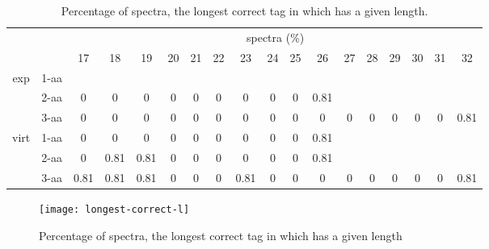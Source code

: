 \documentclass{article}[12pt]
\begin{document}
\begin{landscape}
\begin{table}[h]\tiny
\vspace{3mm}
{\centering
\begin{center}
\begin{tabular}{|c|l|c|c|c|c|c|c|c|c|c|c|c|c|c|c|c|c|}
  \hline
  \multicolumn{2}{|c|}{ } & \multicolumn{ 16 }{|c|}{ spectra (\%)} \\
  \cline{3- 18}
  \multicolumn{2}{|c|}{ }  & 17 & 18 & 19 & 20 & 21 & 22 & 23 & 24 & 25 & 26 & 27 & 28 & 29 & 30 & 31 & 32\\
  \hline
  \multirow{3}{*}{exp}
&  1-aa  &  &  &  &  &  &  &  &  &  &  &  &  &  &  &  & \\
&  2-aa  & 0 & 0 & 0 & 0 & 0 & 0 & 0 & 0 & 0 & 0.81 &  &  &  &  &  & \\
&  3-aa  & 0 & 0 & 0 & 0 & 0 & 0 & 0 & 0 & 0 & 0 & 0 & 0 & 0 & 0 & 0 & 0.81\\
 \hline
  \multirow{3}{*}{virt} 
&  1-aa  & 0 & 0 & 0 & 0 & 0 & 0 & 0 & 0 & 0 & 0.81 &  &  &  &  &  & \\
&  2-aa  & 0 & 0.81 & 0.81 & 0 & 0 & 0 & 0 & 0 & 0 & 0.81 &  &  &  &  &  & \\
&  3-aa  & 0.81 & 0.81 & 0.81 & 0 & 0 & 0 & 0.81 & 0 & 0 & 0 & 0 & 0 & 0 & 0 & 0 & 0.81\\
 \hline
\end{tabular}
\end{center}
\par}
\centering
\caption{ Percentage of spectra, the longest correct tag in which has a given length.}
\label{table:longest-correct-l}
\vspace{3mm}
\end{table}

\end{landscape}

\begin{figure}
  \begin{center}
\texttt{[image: longest-correct-l]}
\end{center}
\caption{Percentage of spectra, the longest correct tag in which has a given length}
  \label{fig:longest-correct-l}
\end{figure}
\end{document}
